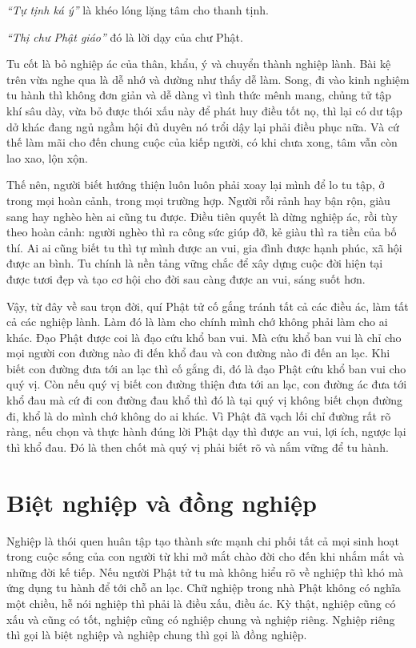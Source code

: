 \documentclass[
  12pt,
  oneside]{book}
\begin{document}
\emph{``Tự tịnh ká ý''} là khéo lóng lặng tâm cho thanh tịnh.

\emph{``Thị chư Phật giáo''} đó là lời dạy của chư Phật.

Tu cốt là bỏ nghiệp ác của thân, khẩu, ý và chuyển thành nghiệp lành. Bài kệ trên vừa nghe qua là dễ nhớ và dường như thấy dễ làm. Song, đi vào kinh nghiệm tu hành thì không đơn giản và dễ dàng vì tình thức mênh mang, chủng tử tập khí sâu dày, vừa bỏ được thói xấu này để phát huy điều tốt nọ, thì lại có dư tập dở khác đang ngủ ngầm hội đủ duyên nó trổi dậy lại phải điều phục nữa. Và cứ thế làm mãi cho đến chung cuộc của kiếp người, có khi chưa xong, tâm vẫn còn lao xao, lộn xộn.

Thế nên, người biết hướng thiện luôn luôn phải xoay lại mình để lo tu tập, ở trong mọi hoàn cảnh, trong mọi trường hợp. Người rỗi rảnh hay bận rộn, giàu sang hay nghèo hèn ai cũng tu được. Điều tiên quyết là dừng nghiệp ác, rồi tùy theo hoàn cảnh: người nghèo thì ra công sức giúp đỡ, kẻ giàu thì ra tiền của bố thí. Ai ai cũng biết tu thì tự mình được an vui, gia đình được hạnh phúc, xã hội được an bình. Tu chính là nền tảng vững chắc để xây dựng cuộc đời hiện tại được tươi đẹp và tạo cơ hội cho đời sau càng được an vui, sáng suốt hơn.

Vậy, từ đây về sau trọn đời, quí Phật tử cố gắng tránh tất cả các điều ác, làm tất cả các nghiệp lành. Làm đó là làm cho chính mình chớ không phải làm cho ai khác. Đạo Phật được coi là đạo cứu khổ ban vui. Mà cứu khổ ban vui là chỉ cho mọi người con đường nào đi đến khổ đau và con đường nào đi đến an lạc. Khi biết con đường đưa tới an lạc thì cố gắng đi, đó là đạo Phật cứu khổ ban vui cho quý vị. Còn nếu quý vị biết con đường thiện đưa tới an lạc, con đường ác đưa tới khổ đau mà cứ đi con đường đau khổ thì đó là tại quý vị không biết chọn đường đi, khổ là do mình chớ không do ai khác. Vì Phật đã vạch lối chỉ đường rất rõ ràng, nếu chọn và thực hành đúng lời Phật dạy thì được an vui, lợi ích, ngược lại thì khổ đau. Đó là then chốt mà quý vị phải biết rõ và nắm vững để tu hành.

\hypertarget{biet-nghiep-va-dong-nghiep}{%
\chapter*{Biệt nghiệp và đồng nghiệp}\label{biet-nghiep-va-dong-nghiep}}

Nghiệp là thói quen huân tập tạo thành sức mạnh chi phối tất cả mọi sinh hoạt trong cuộc sống của con người từ khi mở mắt chào đời cho đến khi nhắm mắt và những đời kế tiếp. Nếu người Phật tử tu mà không hiểu rõ về nghiệp thì khó mà ứng dụng tu hành để tới chỗ an lạc. Chữ nghiệp trong nhà Phật không có nghĩa một chiều, hễ nói nghiệp thì phải là điều xấu, điều ác. Kỳ thật, nghiệp cũng có xấu và cũng có tốt, nghiệp cũng có nghiệp chung và nghiệp riêng. Nghiệp riêng thì gọi là biệt nghiệp và nghiệp chung thì gọi là đồng nghiệp.
\end{document}
